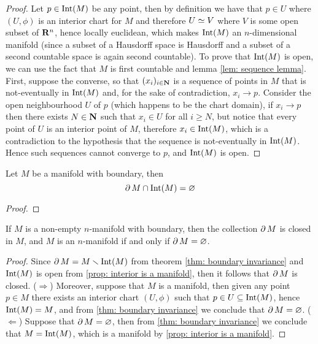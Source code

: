 \begin{proof}
Let \(p \in \operatorname{Int}(M)\) be any point, then by definition we have that \(p \in
U\) where \((U, \phi)\) is an interior chart for \(M\) and therefore \(U \simeq
V\) where \(V\) is some open subset of \(\mathbf{R}^n\), hence locally
euclidean, which makes \(\operatorname{Int}(M)\) an \(n\)-dimensional manifold (since a
subset of a Hausdorff space is Hausdorff and a subset of a second countable
space is again second countable). To prove that \(\operatorname{Int}(M)\) is open, we can
use the fact that \(M\) is first countable and lemma \cref{lem: sequence
lemma}. First, suppose the converse, so that \((x_i)_{i \in \mathbf{N}}\) is a
sequence of points in \(M\) that is not-eventually in \(\operatorname{Int}(M)\) and, for the
sake of contradiction, \(x_i \to p\). Consider the open neighbourhood \(U\) of
\(p\) (which happens to be the chart domain), if \(x_i \to p\) then there exists
\(N \in \mathbf{N}\) such that \(x_i \in U\) for all \(i \geq N\), but notice that every
point of \(U\) is an interior point of \(M\), therefore \(x_i \in \operatorname{Int}(M)\),
which is a contradiction to the hypothesis that the sequence is not-eventually
in \(\operatorname{Int}(M)\). Hence such sequences cannot converge to \(p\), and \(\operatorname{Int}(M)\)
is open.
\end{proof}

\begin{theorem}\label{thm: boundary invariance}
Let \(M\) be a manifold with boundary, then
\[
  \operatorname{\partial} M \cap \operatorname{Int}(M) = \varnothing
\]
\end{theorem}

\begin{proof}
\end{proof}

\begin{corollary}
If \(M\) is a non-empty \(n\)-manifold with boundary, then the collection
\(\operatorname{\partial} M\) is closed in \(M\), and \(M\) is an \(n\)-manifold if and only
if \(\operatorname{\partial} M = \varnothing\).
\end{corollary}

\begin{proof}
Since \(\operatorname{\partial} M = M \smallsetminus \operatorname{Int}(M)\) from theorem \cref{thm: boundary
invariance} and \(\operatorname{Int}(M)\) is open from \cref{prop: interior is a manifold},
then it follows that \(\operatorname{\partial} M\) is closed. (\(\Rightarrow\)) Moreover,
suppose that \(M\) is a manifold, then given any point \(p \in M\) there
exists an interior chart \((U, \phi)\) such that \(p \in U \subseteq
\operatorname{Int}(M)\), hence \(\operatorname{Int}(M) = M\), and from \cref{thm: boundary invariance} we
conclude that \(\operatorname{\partial} M = \varnothing\). (\(\Leftarrow\)) Suppose that
\(\operatorname{\partial} M = \varnothing\), then from \cref{thm: boundary invariance} we
conclude that \(M = \operatorname{Int}(M)\), which is a manifold by \cref{prop: interior is a
manifold}.
\end{proof}

